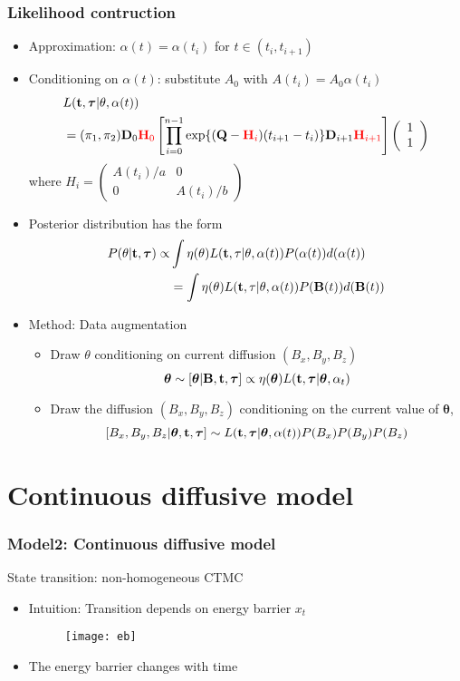 \documentclass[11pt]{beamer}
\newcommand{\bit}{\begin{itemize}\setlength{\itemsep}{0cm}\setlength{\topsep}{0cm}}
\newcommand{\eit}{\end{itemize}}
\newcommand{\bB}{{\bf B}}
\newcommand{\bQ}{{\bf Q}}
\newcommand{\bH}{{\bf H}}
\newcommand{\bD}{{\bf D}}
\newcommand{\btheta}{{\boldsymbol{\theta}}}
\newcommand{\btau}{{\boldsymbol{\tau}}}
\newcommand{\bt}{{\bf t}}
\begin{document}
\begin{frame}
\frametitle{Likelihood contruction}
\bit
\item Approximation: $\alpha(t)=\alpha(t_i)$ for $t\in(t_i,t_{i+1})$ 
\item Conditioning on $\alpha(t)$: substitute $A_0$ with $A(t_i)=A_0\alpha(t_i)$
\pause
\begin{align*}
& L(\bt,\btau|\theta,\alpha(t))\\
&=(\pi_1,\pi_2)\bD_0{\color{red}\bH_0}\left[\prod_{i=0}^{n-1}\exp\{(\bQ-{\color{red}\bH_i})(t_{i+1}- t_i)\}\bD_{i+1}{\color{red}\bH_{i+1}}\right]\left(\begin{array}{c}
1\\
1
\end{array}\right)
\end{align*}
where $H_i=\left(\begin{array}{cc}
A(t_i)/a & 0\\
0 & A(t_i)/b
\end{array}\right)$
\eit
\end{frame}
\begin{frame}
\bit
\pause
\item Posterior distribution has the form
\begin{align*}
P(\theta|\bt,\btau)\propto & \int \eta(\theta)L(\bt,\tau|\theta,\alpha(t))P(\alpha(t))d(\alpha(t))\\
&= \int \eta(\theta)L(\bt,\tau|\theta,\alpha(t))P(\bB(t))d(\bB(t))
\end{align*}
\pause
\item Method: Data augmentation
\bit
\item Draw $\theta$ conditioning on current diffusion $(B_x,B_y,B_z)$
$$\btheta\sim[\btheta|\bB,\bt,\btau]\propto \eta(\btheta)L(\bt,\btau|\btheta,\alpha_t)$$
\item Draw the diffusion $(B_x,B_y,B_z)$ conditioning on the current value of $\btheta$,
$$[B_x,B_y,B_z|\btheta,\bt,\btau]\sim L(\bt,\btau|\btheta,\alpha(t))
P(B_x)P(B_y)P(B_z)$$
\eit
\eit
\end{frame}

\section{Continuous diffusive model}
\begin{frame}
\frametitle{Model2: Continuous diffusive model}
State transition: non-homogeneous CTMC
\bit 
\item Intuition: Transition depends on energy barrier $x_t$
\begin{figure}
\centering
\texttt{[image: eb]}
\end{figure}
\item The energy barrier changes with time
\eit
\end{frame}
\end{document}
